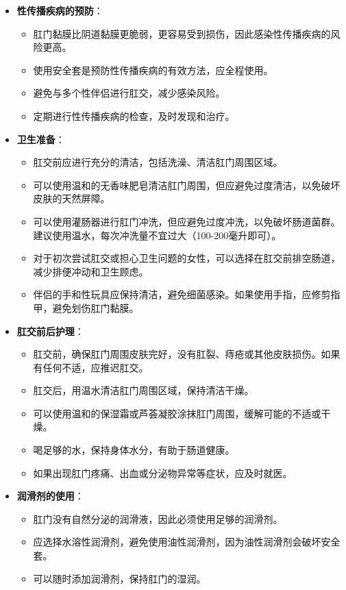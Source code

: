 \documentclass[12pt,UTF8]{ctexbook}
\begin{document}
\begin{itemize}
	\item \textbf{性传播疾病的预防}：
	\begin{itemize}
		\item 肛门黏膜比阴道黏膜更脆弱，更容易受到损伤，因此感染性传播疾病的风险更高。
		\item 使用安全套是预防性传播疾病的有效方法，应全程使用。
		\item 避免与多个性伴侣进行肛交，减少感染风险。
		\item 定期进行性传播疾病的检查，及时发现和治疗。
	\end{itemize}
	\item \textbf{卫生准备}：
	\begin{itemize}
		\item 肛交前应进行充分的清洁，包括洗澡、清洁肛门周围区域。
		\item 可以使用温和的无香味肥皂清洁肛门周围，但应避免过度清洁，以免破坏皮肤的天然屏障。
		\item 可以使用灌肠器进行肛门冲洗，但应避免过度冲洗，以免破坏肠道菌群。建议使用温水，每次冲洗量不宜过大（100-200毫升即可）。
		\item 对于初次尝试肛交或担心卫生问题的女性，可以选择在肛交前排空肠道，减少排便冲动和卫生顾虑。
		\item 伴侣的手和性玩具应保持清洁，避免细菌感染。如果使用手指，应修剪指甲，避免划伤肛门黏膜。
	\end{itemize}
	\item \textbf{肛交前后护理}：
	\begin{itemize}
		\item 肛交前，确保肛门周围皮肤完好，没有肛裂、痔疮或其他皮肤损伤。如果有任何不适，应推迟肛交。
		\item 肛交后，用温水清洁肛门周围区域，保持清洁干燥。
		\item 可以使用温和的保湿霜或芦荟凝胶涂抹肛门周围，缓解可能的不适或干燥。
		\item 喝足够的水，保持身体水分，有助于肠道健康。
		\item 如果出现肛门疼痛、出血或分泌物异常等症状，应及时就医。
	\end{itemize}
	\item \textbf{润滑剂的使用}：
	\begin{itemize}
		\item 肛门没有自然分泌的润滑液，因此必须使用足够的润滑剂。
		\item 应选择水溶性润滑剂，避免使用油性润滑剂，因为油性润滑剂会破坏安全套。
		\item 可以随时添加润滑剂，保持肛门的湿润。

\end{itemize}
\end{itemize}
\end{document}
